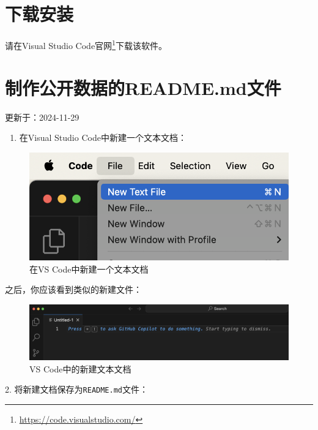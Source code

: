 \documentclass[]{ctexbook}
\providecommand{\tightlist}{%
  \setlength{\itemsep}{0pt}\setlength{\parskip}{0pt}}
\renewcommand{\href}[2]{#2\footnote{\url{#1}}}
\theoremstyle{definition}
\theoremstyle{definition}
\theoremstyle{definition}
\theoremstyle{definition}
\theoremstyle{remark}
\begin{document}
\section{下载安装}\label{ux4e0bux8f7dux5b89ux88c5-1}

请在\href{https://code.visualstudio.com/}{Visual Studio Code官网}下载该软件。

\section{制作公开数据的README.md文件}\label{mkreadme}

更新于：2024-11-29

\begin{enumerate}
\def\labelenumi{\arabic{enumi}.}
\tightlist
\item
  在Visual Studio Code中新建一个文本文档：
\end{enumerate}

\begin{figure}

{\centering \includegraphics[width=0.6\linewidth]{img/vscode/mkreadme_mknewfile} 

}

\caption{在VS Code中新建一个文本文档}\label{fig:mkreadme-mknewfile}
\end{figure}

之后，你应该看到类似的新建文件：

\begin{figure}

{\centering \includegraphics[width=1\linewidth]{img/vscode/mkreadme_newfile} 

}

\caption{VS Code中的新建文本文档}\label{fig:mkreadme-newfile}
\end{figure}

2. 将新建文档保存为\texttt{README.md}文件：
\end{document}
